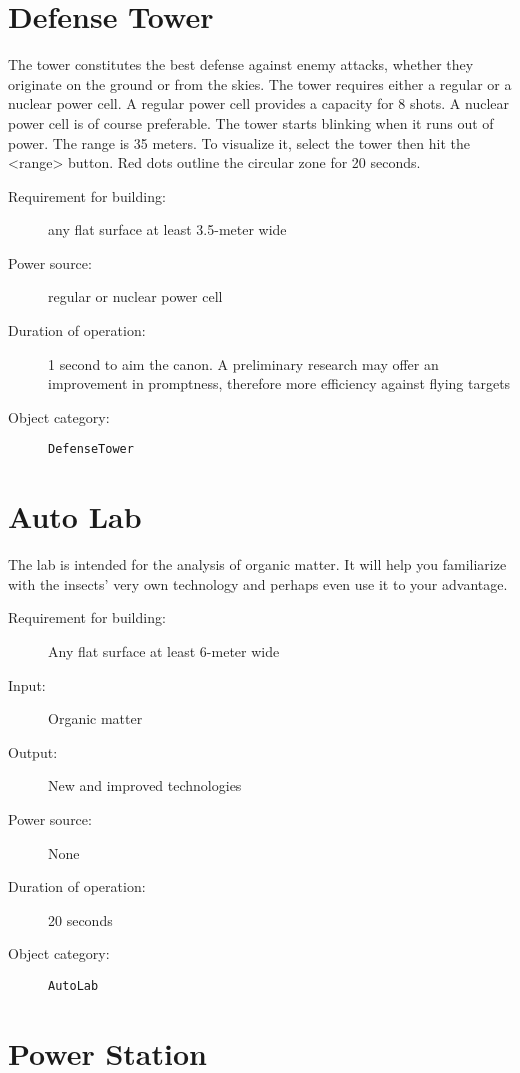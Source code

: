\section{Defense Tower}

The tower constitutes the best defense against enemy attacks, whether they originate on the ground or from the skies. The tower requires either a regular or a nuclear power cell. A regular power cell provides a capacity for 8 shots. A nuclear power cell is of course preferable. The tower starts blinking when it runs out of power. The range is 35 meters. To visualize it, select the tower then hit the <range> button. Red dots outline the circular zone for 20 seconds.

\begin{description}
    \item[Requirement for building:] any flat surface at least 3.5-meter wide
    \item[Power source:] regular or nuclear power cell
    \item[Duration of operation:] 1 second to aim the canon. A preliminary research may offer an improvement in promptness, therefore more efficiency against flying targets
    \item[Object category:] \texttt{DefenseTower}
\end{description}


\section{Auto Lab}

The lab is intended for the analysis of organic matter. It will help you familiarize with the insects' very own technology and perhaps even use it to your advantage.

\begin{description}
    \item[Requirement for building:] Any flat surface at least 6-meter wide
    \item[Input:] Organic matter
    \item[Output:] New and improved technologies
    \item[Power source:] None
    \item[Duration of operation:] 20 seconds
    \item[Object category:] \texttt{AutoLab}
\end{description}


\section{Power Station}

